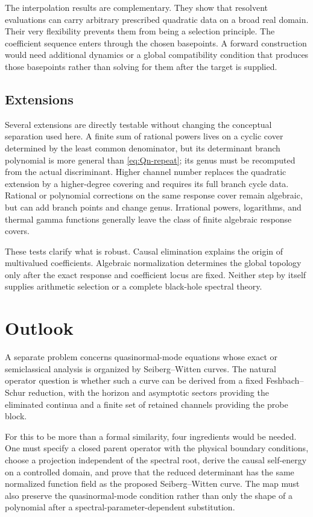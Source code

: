 \documentclass[11pt,reqno]{amsart}
\theoremstyle{remark}
\begin{document}
The interpolation results are complementary.  They show that resolvent
evaluations can carry arbitrary prescribed quadratic data on a broad real
domain.  Their very flexibility prevents them from being a
selection principle.  The coefficient sequence enters through the chosen
basepoints.  A forward construction would need additional dynamics or a
global compatibility condition that produces those basepoints rather than
solving for them after the target is supplied.

\subsection{Extensions}

Several extensions are directly testable without changing the conceptual
separation used here.  A finite sum of rational powers lives on a cyclic
cover determined by the least common denominator, but its determinant branch
polynomial is more general than \eqref{eq:Qn-repeat}; its genus must be
recomputed from the actual discriminant.  Higher channel number replaces the
quadratic extension by a higher-degree covering and requires its full branch
cycle data.  Rational or polynomial corrections on the same response cover
remain algebraic, but can add branch points and change genus.  Irrational
powers, logarithms, and thermal gamma functions generally leave the class of
finite algebraic response covers.

These tests clarify what is robust.  Causal elimination explains the origin
of multivalued coefficients.  Algebraic normalization determines the global
topology only after the exact response and coefficient locus are fixed.
Neither step by itself supplies arithmetic selection or a complete
black-hole spectral theory.

\section{Outlook}\label{sec:outlook}

A separate problem concerns quasinormal-mode equations whose exact or
semiclassical analysis is organized by Seiberg--Witten curves.  The natural
operator question is whether such a curve can be derived from a fixed
Feshbach--Schur reduction, with the horizon and asymptotic sectors providing
the eliminated continua and a finite set of retained channels providing the
probe block.

For this to be more than a formal similarity, four ingredients would be
needed.  One must specify a closed parent operator with the physical boundary
conditions, choose a projection independent of the spectral root, derive the
causal self-energy on a controlled domain, and prove that the reduced
determinant has the same normalized function field as the proposed
Seiberg--Witten curve.  The map must also preserve the quasinormal-mode
condition rather than only the shape of a polynomial after a
spectral-parameter-dependent substitution.
\end{document}
